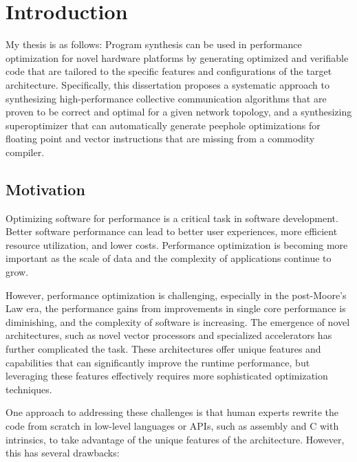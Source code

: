 \chapter{Introduction}
\label{chap:intro}

My thesis is as follows:
%
Program synthesis can be used in performance optimization for novel
hardware platforms by generating optimized and verifiable code that
are tailored to the specific features and configurations of the target
architecture.
%
Specifically, this dissertation proposes a systematic approach to
synthesizing high-performance collective communication algorithms that
are proven to be correct and optimal for a given network topology, and
a synthesizing superoptimizer that can automatically generate peephole
optimizations for floating point and vector instructions that are
missing from a commodity compiler.

\section{Motivation}

Optimizing software for performance is a critical task in software
development.
%
Better software performance can lead to better user experiences, more
efficient resource utilization, and lower costs.
%
Performance optimization is becoming more important as the
scale of data and the complexity of applications continue to grow.


However, performance optimization is challenging, especially in the
post-Moore's Law era, the performance gains from improvements in
single core performance is diminishing, and the complexity of
software is increasing.
%
The emergence of novel architectures, such as novel vector processors
and specialized accelerators has further complicated the task.
%
These architectures offer unique features and capabilities that can
significantly improve the runtime performance, but leveraging these
features effectively requires more sophisticated optimization
techniques.

One approach to addressing these challenges is that human experts
rewrite the code from scratch in low-level languages or APIs, such as assembly
and C with intrinsics, to take advantage of the unique features of the
architecture. However, this has several drawbacks:

